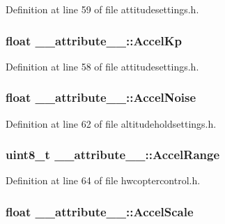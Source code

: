 \-Definition at line 59 of file attitudesettings.\-h.

\hypertarget{struct____attribute_____a981e932927ebbd0fb7c5c85c08e21e44}{
\subsubsection[{\-Accel\-Kp}]{\setlength{\rightskip}{0pt plus 5cm}float {\bf \-\_\-\-\_\-attribute\-\_\-\-\_\-\-::\-Accel\-Kp}}}\label{struct____attribute_____a981e932927ebbd0fb7c5c85c08e21e44}


\-Definition at line 58 of file attitudesettings.\-h.

\hypertarget{struct____attribute_____acc365d09e02f1b8d0a9b56377c8a9724}{
\subsubsection[{\-Accel\-Noise}]{\setlength{\rightskip}{0pt plus 5cm}float {\bf \-\_\-\-\_\-attribute\-\_\-\-\_\-\-::\-Accel\-Noise}}}\label{struct____attribute_____acc365d09e02f1b8d0a9b56377c8a9724}


\-Definition at line 62 of file altitudeholdsettings.\-h.

\hypertarget{struct____attribute_____a9bcc0097034336773af69991c0e5a753}{
\subsubsection[{\-Accel\-Range}]{\setlength{\rightskip}{0pt plus 5cm}uint8\-\_\-t {\bf \-\_\-\-\_\-attribute\-\_\-\-\_\-\-::\-Accel\-Range}}}\label{struct____attribute_____a9bcc0097034336773af69991c0e5a753}


\-Definition at line 64 of file hwcoptercontrol.\-h.

\hypertarget{struct____attribute_____a9420b9badb1ef8f076118b174b36cfd4}{
\subsubsection[{\-Accel\-Scale}]{\setlength{\rightskip}{0pt plus 5cm}float {\bf \-\_\-\-\_\-attribute\-\_\-\-\_\-\-::\-Accel\-Scale}}}\label{struct____attribute_____a9420b9badb1ef8f076118b174b36cfd4}


